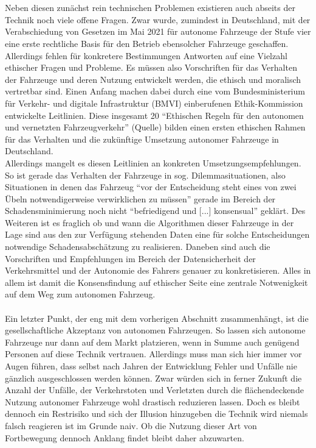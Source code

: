 \documentclass[10pt,a4paper]{article}
\begin{document}
\\
\\
Neben diesen zunächst rein technischen Problemen existieren auch abseits der Technik noch viele offene Fragen. Zwar wurde, zumindest in Deutschland, mit der Verabschiedung von Gesetzen im Mai 2021 für autonome Fahrzeuge der Stufe vier eine erste rechtliche Basis für den Betrieb ebensolcher Fahrzeuge geschaffen. Allerdings fehlen für konkretere Bestimmungen Antworten auf eine Vielzahl ethischer Fragen und Probleme. Es müssen also Vorschriften für das Verhalten der Fahrzeuge und deren Nutzung entwickelt werden, die ethisch und moralisch vertretbar sind. Einen Anfang machen dabei durch eine vom Bundesministerium für Verkehr- und digitale Infrastruktur (BMVI) einberufenen Ethik-Kommission entwickelte Leitlinien. Diese insgesamt 20 ``Ethischen Regeln für den autonomen und vernetzten Fahrzeugverkehr'' (Quelle) bilden einen ersten ethischen Rahmen für das Verhalten und die zukünftige Umsetzung autonomer Fahrzeuge in Deutschland.
\\
Allerdings mangelt es diesen Leitlinien an konkreten Umsetzungsempfehlungen. So ist gerade das Verhalten der Fahrzeuge in sog. Dilemmasituationen, also Situationen in denen das Fahrzeug ``vor der Entscheidung steht eines von zwei Übeln notwendigerweise verwirklichen zu müssen''\cite{EthikBericht} gerade im Bereich der Schadensminimierung noch nicht ``befriedigend und [...] konsensual''\cite{EthikBericht} geklärt. Des Weiteren ist es fraglich ob und wann die Algorithmen dieser Fahrzeuge in der Lage sind aus den zur Verfügung stehenden Daten eine für solche Entscheidungen notwendige Schadensabschätzung zu realisieren. Daneben sind auch die Vorschriften und Empfehlungen im Bereich der Datensicherheit der Verkehrsmittel und der Autonomie des Fahrers genauer zu konkretisieren. Alles in allem ist damit die Konsensfindung auf ethischer Seite eine zentrale Notwenigkeit auf dem Weg zum autonomen Fahrzeug. \cite{EthikBericht}
\\
\\
Ein letzter Punkt, der eng mit dem vorherigen Abschnitt zusammenhängt, ist die gesellschaftliche Akzeptanz von autonomen Fahrzeugen. So lassen sich autonome Fahrzeuge nur dann auf dem Markt platzieren, wenn in Summe auch genügend Personen auf diese Technik vertrauen. Allerdings muss man sich hier immer vor Augen führen, dass  selbst nach Jahren der Entwicklung Fehler und Unfälle nie gänzlich ausgeschlossen werden können. Zwar würden sich in ferner Zukunft die Anzahl der Unfälle, der Verkehrstoten und Verletzten durch die flächendeckende Nutzung autonomer Fahrzeuge wohl drastisch reduzieren lassen. Doch es bleibt dennoch ein Restrisiko und sich der Illusion hinzugeben die Technik wird niemals falsch reagieren ist im Grunde naiv. Ob die Nutzung dieser Art von Fortbewegung dennoch Anklang findet bleibt daher abzuwarten.
\end{document}
